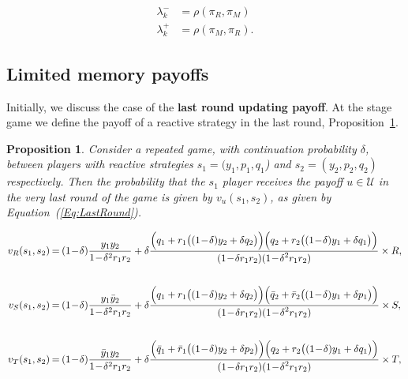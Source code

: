 \documentclass[11pt]{article}
\theoremstyle{plainCl1}
\newtheorem{Prop}{Proposition}
\theoremstyle{plainCl2}
\begin{document}
\begin{align*} 
  \lambda^-_k &\!=\!\rho(\pi_R, \pi_M) \\
  \lambda^+_k &\!=\!\rho(\pi_M, \pi_R).
\end{align*}

\subsection*{Limited memory payoffs}

Initially, we discuss the case of the \textbf{last round updating payoff}. At the stage
game we define the payoff of a reactive strategy in the last round,
Proposition~\ref{proposition:last_round}.

\begin{Prop}\label{proposition:last_round}
    Consider a repeated game, with
    continuation probability $\delta$, between players with reactive strategies
    $s_1\!=\!(y_1, p_1, q_1$)  and $s_2\!=\!(y_2,p_2,q_2)$ respectively. Then the
    probability that the $s_1$ player receives the payoff $u\!\in\! \mathcal{U}$ in
    the very last round of the game is given by $v_{u}(s_1,s_2)$, as given by
    Equation~(\ref{Eq:LastRound}).

    \begin{equation} \label{Eq:LastRound}
      \setlength{\arraycolsep}{1pt}
      \begin{array}{rcl}
    
      v_{R}(s_1,s_2) &= &\displaystyle (1\!-\!\delta)\frac{y_1y_2}{1\!-\!\delta^2 r_1 r_2}+\delta \frac{\Big(q_1+r_1\big((1\!-\!\delta)y_2+\delta q_2\big)\Big) \Big(q_2+r_2\big((1\!-\!\delta)y_1+\delta q_1\big)\Big)}
      {\displaystyle(1\!-\!\delta r_1r_2)(1\!-\!\delta^2 r_1 r_2)} \times R,\\[1cm]
    
      v_{S}(s_1,s_2) &= &\displaystyle (1\!-\!\delta)\frac{y_1\bar{y}_2}{1\!-\!\delta^2 r_1 r_2}+\delta \frac{\Big(q_1+r_1\big((1\!-\!\delta)y_2+\delta q_2\big)\Big) \Big(\bar{q}_2+\bar{r}_2\big((1\!-\!\delta)y_1+\delta p_1\big)\Big)}
      {\displaystyle(1\!-\!\delta r_1r_2)(1\!-\!\delta^2 r_1 r_2)} \times S,\\[1cm]
    
      v_{T}(s_1,s_2) &= &\displaystyle (1\!-\!\delta)\frac{\bar{y}_1y_2}{1\!-\!\delta^2 r_1 r_2}+\delta \frac{\Big(\bar{q}_1+\bar{r}_1\big((1\!-\!\delta)y_2+\delta p_2\big)\Big) \Big(q_2+r_2\big((1\!-\!\delta)y_1+\delta q_1\big)\Big)}
      {\displaystyle(1\!-\!\delta r_1r_2)(1\!-\!\delta^2 r_1 r_2)} \times T,\\[1cm]
    

\end{array}
\end{equation}
\end{Prop}
\end{document}
